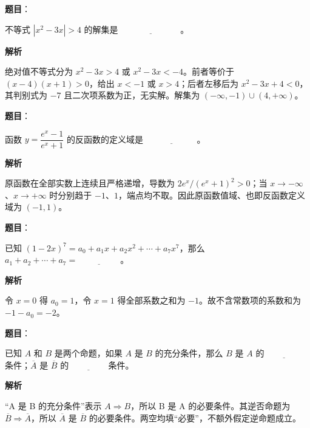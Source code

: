 \begin{answer}

\textbf{题目}：

不等式 $|x^2-3x|>4$ 的解集是 $\underline{\hspace{7em}}$。

\textbf{解析}

绝对值不等式分为 $x^2-3x>4$ 或 $x^2-3x<-4$。前者等价于 $(x-4)(x+1)>0$，给出 $x<-1$ 或 $x>4$；后者左移后为 $x^2-3x+4<0$，其判别式为 $-7$ 且二次项系数为正，无实解。解集为 $(-\infty,-1)\cup(4,+\infty)$。


\end{answer}
\begin{answer}

\textbf{题目}：

函数 $y=\dfrac{e^x-1}{e^x+1}$ 的反函数的定义域是 $\underline{\hspace{6em}}$。

\textbf{解析}

原函数在全部实数上连续且严格递增，导数为 $2e^x/(e^x+1)^2>0$；当 $x\to-\infty$、$x\to+\infty$ 时分别趋于 $-1$、$1$，端点均不取。因此原函数值域、也即反函数定义域为 $(-1,1)$。


\end{answer}
\begin{answer}

\textbf{题目}：

已知 $(1-2x)^7=a_0+a_1x+a_2x^2+\cdots+a_7x^7$，那么 $a_1+a_2+\cdots+a_7=\underline{\hspace{5em}}$。

\textbf{解析}

令 $x=0$ 得 $a_0=1$，令 $x=1$ 得全部系数之和为 $-1$。故不含常数项的系数和为 $-1-a_0=-2$。


\end{answer}
\begin{answer}

\textbf{题目}：

已知 $A$ 和 $B$ 是两个命题，如果 $A$ 是 $B$ 的充分条件，那么 $B$ 是 $A$ 的 $\underline{\hspace{4em}}$ 条件；$\overline A$ 是 $\overline B$ 的 $\underline{\hspace{4em}}$ 条件。

\textbf{解析}

“A 是 B 的充分条件”表示 $A\Rightarrow B$，所以 B 是 A 的必要条件。其逆否命题为 $\overline B\Rightarrow\overline A$，所以 $\overline A$ 是 $\overline B$ 的必要条件。两空均填“必要”，不额外假定逆命题成立。


\end{answer}
